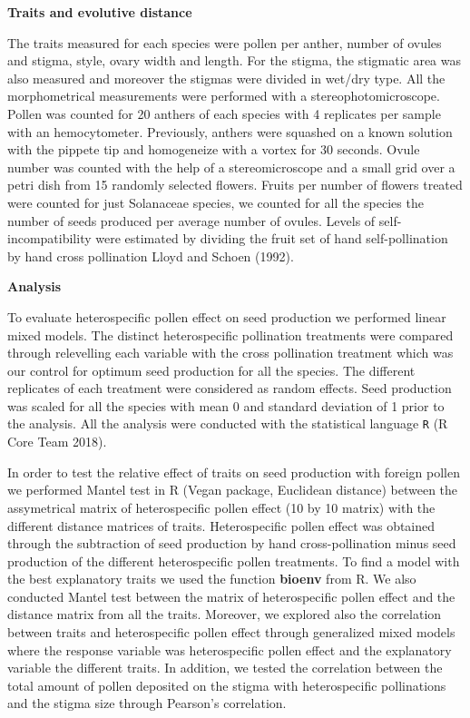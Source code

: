 \documentclass[11pt,a4paper]{article}
\begin{document}
\textbf{Traits and evolutive distance}

The traits measured for each species were pollen per anther, number of
ovules and stigma, style, ovary width and length. For the stigma, the
stigmatic area was also measured and moreover the stigmas were divided
in wet/dry type. All the morphometrical measurements were performed with
a stereophotomicroscope. Pollen was counted for 20 anthers of each
species with 4 replicates per sample with an hemocytometer. Previously,
anthers were squashed on a known solution with the pippete tip and
homogeneize with a vortex for 30 seconds. Ovule number was counted with
the help of a stereomicroscope and a small grid over a petri dish from
15 randomly selected flowers. Fruits per number of flowers treated were
counted for just Solanaceae species, we counted for all the species the
number of seeds produced per average number of ovules. Levels of
self-incompatibility were estimated by dividing the fruit set of hand
self-pollination by hand cross pollination Lloyd and Schoen (1992).

\textbf{Analysis}

To evaluate heterospecific pollen effect on seed production we performed
linear mixed models. The distinct heterospecific pollination treatments
were compared through relevelling each variable with the cross
pollination treatment which was our control for optimum seed production
for all the species. The different replicates of each treatment were
considered as random effects. Seed production was scaled for all the
species with mean 0 and standard deviation of 1 prior to the analysis.
All the analysis were conducted with the statistical language \texttt{R}
(R Core Team 2018).

In order to test the relative effect of traits on seed production with
foreign pollen we performed Mantel test in R (Vegan package, Euclidean
distance) between the assymetrical matrix of heterospecific pollen
effect (10 by 10 matrix) with the different distance matrices of traits.
Heterospecific pollen effect was obtained through the subtraction of
seed production by hand cross-pollination minus seed production of the
different heterospecific pollen treatments. To find a model with the
best explanatory traits we used the function \textbf{bioenv} from R. We
also conducted Mantel test between the matrix of heterospecific pollen
effect and the distance matrix from all the traits. Moreover, we
explored also the correlation between traits and heterospecific pollen
effect through generalized mixed models where the response variable was
heterospecific pollen effect and the explanatory variable the different
traits. In addition, we tested the correlation between the total amount
of pollen deposited on the stigma with heterospecific pollinations and
the stigma size through Pearson's correlation.
\end{document}
